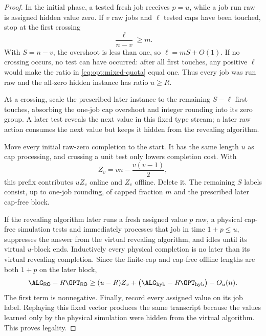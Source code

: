 \begin{proof}
In the initial phase, a tested fresh job receives $p=u$, while a job run raw
is assigned hidden value zero.  If $v$ raw jobs and $\ell$ tested caps have
been touched, stop at the first crossing
\begin{equation}
 \frac{\ell}{n-v}\ge m.
 \label{eq:opt:mixed-quota}
\end{equation}
With $S=n-v$, the overshoot is less than one, so $\ell=mS+O(1)$.  If no
crossing occurs, no test can have occurred: after all first touches, any
positive $\ell$ would make the ratio in \cref{eq:opt:mixed-quota} equal one.
Thus every job was run raw and the all-zero hidden instance has ratio
$u\ge R$.

At a crossing, scale the prescribed later instance to the remaining
$S-\ell$ first touches, absorbing the one-job cap overshoot and integer
rounding into its zero group.  A later test reveals the next value in this
fixed type stream; a later raw action consumes the next value but keeps it
hidden from the revealing algorithm.

Move every initial raw-zero completion to the start.  It has the same length
$u$ as cap processing, and crossing a unit test only lowers completion cost.
With
\begin{equation}
 Z_v=vn-\frac{v(v-1)}2,
\end{equation}
this prefix contributes $uZ_v$ online and $Z_v$ offline.  Delete it.  The
remaining $S$ labels consist, up to one-job rounding, of capped fraction $m$
and the prescribed later cap-free block.

If the revealing algorithm later runs a fresh assigned value $p$ raw, a
physical cap-free simulation tests and immediately processes that job in
time $1+p\le u$, suppresses the answer from the virtual revealing algorithm,
and idles until its virtual $u$-block ends.  Inductively every physical
completion is no later than its virtual revealing completion.  Since the
finite-cap and cap-free offline lengths are both $1+p$ on the later block,
\begin{equation}
 \ALG_{\mathsf{RO}}-R\OPT_{\mathsf{RO}}
 \ge (u-R)Z_v+
 \bigl(\ALG_{\rm hyb}-R\OPT_{\rm hyb}\bigr)-O_u(n).
 \label{eq:opt:mixed-raw-decomposition}
\end{equation}
The first term is nonnegative.  Finally, record every assigned value on its
job label.  Replaying this fixed vector produces the same transcript because
the values learned only by the physical simulation were hidden from the
virtual algorithm.  This proves legality.
\end{proof}

